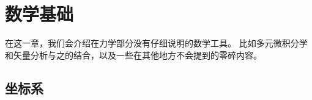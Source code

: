 \chapter{数学基础}\label{chap:math-basics}

\begin{intro}
    在这一章，我们会介绍在力学部分没有仔细说明的数学工具。
    比如多元微积分学和矢量分析与之的结合，以及一些在其他地方不会提到的零碎内容。
\end{intro}

\section{坐标系}



